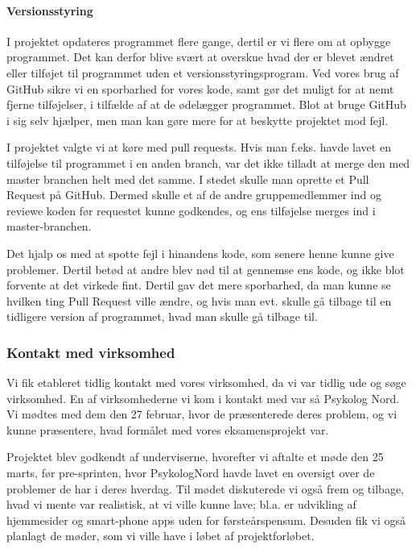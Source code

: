 \paragraph{Versionsstyring}
I projektet opdateres programmet flere gange, dertil er vi flere om at opbygge programmet. Det kan derfor blive svært at overskue hvad der er blevet ændret eller tilføjet til programmet uden et versionsstyringsprogram. Ved vores brug af GitHub sikre vi en sporbarhed for vores kode, samt gør det muligt for at nemt fjerne tilføjelser, i tilfælde af at de ødelægger programmet. Blot at bruge GitHub i sig selv hjælper, men man kan gøre mere for at beskytte projektet mod fejl.

I projektet valgte vi at køre med pull requests. 
Hvis man f.eks. havde lavet en tilføjelse til programmet i en anden branch, 
var det ikke tilladt at merge den med master branchen helt med det samme. 
I stedet skulle man oprette et Pull Request på GitHub. 
Dermed skulle et af de andre gruppemedlemmer ind og reviewe koden før requestet kunne godkendes, 
og ens tilføjelse merges ind i master-branchen.

Det hjalp os med at spotte fejl i hinandens kode, som senere henne kunne give problemer. Dertil betød at andre blev nød til at gennemse ens kode, og ikke blot forvente at det virkede fint. Dertil gav det mere sporbarhed, da man kunne se hvilken ting Pull Request ville ændre, og hvis man evt. skulle gå tilbage til en tidligere version af programmet, hvad man skulle gå tilbage til. 

\subsubsection{Kontakt med virksomhed}

Vi fik etableret tidlig kontakt med vores virksomhed, da vi var tidlig ude og søge virksomhed.
En af virksomhederne vi kom i kontakt med var så Psykolog Nord.
Vi mødtes med dem den 27 februar, hvor de præsenterede deres problem, og vi kunne præsentere, hvad formålet med vores eksamensprojekt var.

Projektet blev godkendt af underviserne, hvorefter vi aftalte et møde den 25 marts, før pre-sprinten, hvor PsykologNord havde lavet en oversigt over de problemer de har i deres hverdag.
Til mødet diskuterede vi også frem og tilbage, hvad vi mente var realistisk, at vi ville kunne lave; bl.a. er udvikling af hjemmesider og smart-phone apps uden for førsteårspensum.
Desuden fik vi også planlagt de møder, som vi ville have i løbet af projektforløbet.

